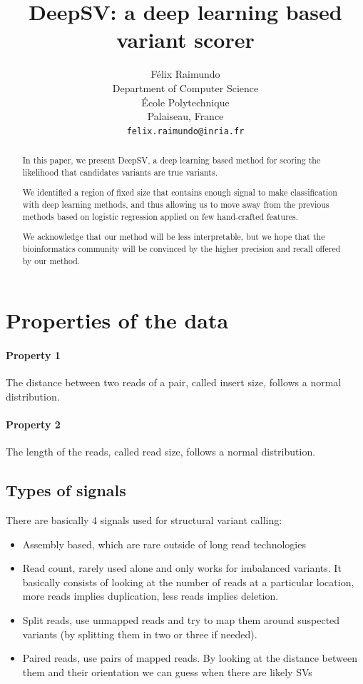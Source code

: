 \documentclass{article}
\title{DeepSV: a deep learning based variant scorer}
\author{
  Félix Raimundo\\
  Department of Computer Science\\
  École Polytechnique\\
  Palaiseau, France\\
  \texttt{felix.raimundo@inria.fr}
}
\begin{document}
\maketitle

\begin{abstract}
  In this paper, we present DeepSV, a deep learning based method for scoring the likelihood that candidates variants are true variants.
  
  We identified a region of fixed size that contains enough signal to make classification
  with deep learning methods, and thus allowing us to move away from the previous methods
  based on logistic regression applied on few hand-crafted features.
  
  We acknowledge that our method will be less interpretable, but we hope that the bioinformatics community will be convinced by the higher precision and recall offered by our method. 
\end{abstract}

\section{Properties of the data}

\paragraph{Property 1} The distance between two reads of a pair, called insert size, follows a normal distribution.
\paragraph{Property 2} The length of the reads, called read size, follows a normal distribution.


\subsection{Types of signals}

There are basically 4 signals used for structural variant calling:

\begin{itemize}
	\item Assembly based, which are rare outside of long read technologies
	\item Read count, rarely used alone and only works for imbalanced variants. It basically consists
of looking at the number of reads at a particular location, more reads implies duplication, less
reads implies deletion.
	\item Split reads, use unmapped reads and try to map them around suspected variants (by splitting them
in two or three if needed).
	\item Paired reads, use pairs of mapped reads. By looking at the distance between them and their
orientation we can guess when there are likely SVs
\end{itemize}
\end{document}
